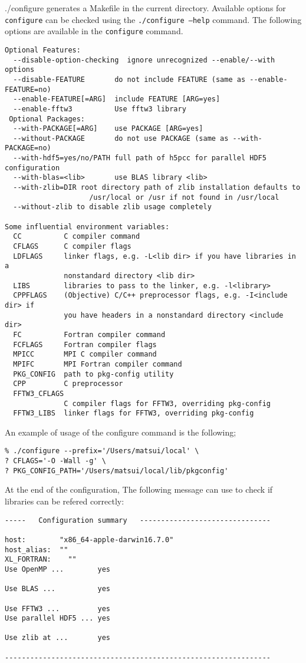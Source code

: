{./configure} generates a Makefile in the current directory.  Available options for {\tt configure} can be checked using the {\tt ./configure --help} command. The following options are available in the {\tt configure} command.
%
{\small
\begin{verbatim}
Optional Features:
  --disable-option-checking  ignore unrecognized --enable/--with options
  --disable-FEATURE       do not include FEATURE (same as --enable-FEATURE=no)
  --enable-FEATURE[=ARG]  include FEATURE [ARG=yes]
  --enable-fftw3          Use fftw3 library 
 Optional Packages:
  --with-PACKAGE[=ARG]    use PACKAGE [ARG=yes]
  --without-PACKAGE       do not use PACKAGE (same as --with-PACKAGE=no)
  --with-hdf5=yes/no/PATH full path of h5pcc for parallel HDF5 configuration
  --with-blas=<lib>       use BLAS library <lib>
  --with-zlib=DIR root directory path of zlib installation defaults to
                    /usr/local or /usr if not found in /usr/local
  --without-zlib to disable zlib usage completely

Some influential environment variables:
  CC          C compiler command
  CFLAGS      C compiler flags
  LDFLAGS     linker flags, e.g. -L<lib dir> if you have libraries in a
              nonstandard directory <lib dir>
  LIBS        libraries to pass to the linker, e.g. -l<library>
  CPPFLAGS    (Objective) C/C++ preprocessor flags, e.g. -I<include dir> if
              you have headers in a nonstandard directory <include dir>
  FC          Fortran compiler command
  FCFLAGS     Fortran compiler flags
  MPICC       MPI C compiler command
  MPIFC       MPI Fortran compiler command
  PKG_CONFIG  path to pkg-config utility
  CPP         C preprocessor
  FFTW3_CFLAGS
              C compiler flags for FFTW3, overriding pkg-config
  FFTW3_LIBS  linker flags for FFTW3, overriding pkg-config

\end{verbatim}
}
%
An example of usage of the configure command is the following;
\begin{verbatim}
% ./configure --prefix='/Users/matsui/local' \
? CFLAGS='-O -Wall -g' \
? PKG_CONFIG_PATH='/Users/matsui/local/lib/pkgconfig'
\end{verbatim}

At the end of the configuration, The following message can use to check if libraries can be refered correctly:

{\small
\begin{verbatim}
-----   Configuration summary   -------------------------------

host:        "x86_64-apple-darwin16.7.0"
host_alias:  ""
XL_FORTRAN:    ""
Use OpenMP ...        yes

Use BLAS ...          yes

Use FFTW3 ...         yes
Use parallel HDF5 ... yes

Use zlib at ...       yes

---------------------------------------------------------------
\end{verbatim}
}


